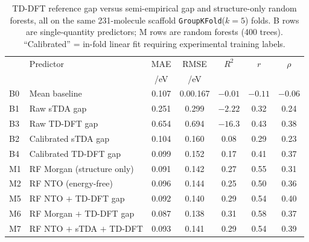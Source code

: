 \documentclass[twoside,twocolumn,9pt]{extarticle}
\begin{document}
\begin{table}[htbp]
  \centering
  \caption{TD-DFT reference gap versus semi-empirical gap and structure-only
    random forests, all on the same \num{231}-molecule scaffold
    \texttt{GroupKFold}($k=5$) folds. B rows are single-quantity predictors;
    M rows are random forests (\num{400} trees). ``Calibrated'' = in-fold linear
    fit requiring experimental training labels.}
  \label{tab:tddft_headtohead}
  \small
  \begin{tabular}{llccccc}
    \toprule
    & Predictor & MAE & RMSE & $R^2$ & $r$ & $\rho$ \\
    &           & /eV & /eV  &       &     &        \\
    \midrule
    B0 & Mean baseline                 & 0.107 & 0.00.167 & $-0.01$  & $-0.11$ & $-0.06$ \\
    B1 & Raw sTDA gap                  & 0.251 & 0.299 & $-2.22$  & 0.32 & 0.24 \\
    B3 & Raw TD-DFT gap                & 0.654 & 0.694 & $-16.3$  & 0.43 & 0.38 \\
    B2 & Calibrated sTDA gap           & 0.104 & 0.160 & 0.08     & 0.29 & 0.23 \\
    B4 & Calibrated TD-DFT gap         & 0.099 & 0.152 & 0.17     & 0.41 & 0.37 \\
    \midrule
    M1 & RF Morgan (structure only)    & 0.091 & 0.142 & 0.27 & 0.55 & 0.31 \\
    M2 & RF NTO (energy-free)          & 0.096 & 0.144 & 0.25 & 0.50 & 0.36 \\
    M5 & RF NTO $+$ TD-DFT gap         & 0.092 & 0.140 & 0.29 & 0.54 & 0.40 \\
    M6 & RF Morgan $+$ TD-DFT gap      & 0.087 & 0.138 & 0.31 & 0.58 & 0.37 \\
    M7 & RF NTO $+$ sTDA $+$ TD-DFT    & 0.093 & 0.141 & 0.29 & 0.54 & 0.39 \\
    \bottomrule
  \end{tabular}
\end{table}
\end{document}
